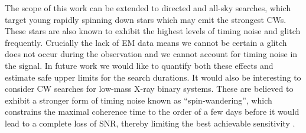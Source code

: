 \documentclass[../full_thesis/full_thesis.tex]{subfiles}
\begin{document}
The scope of this work can be extended to  directed and all-sky searches, which
target young rapidly spinning down stars which may emit the strongest CWs.
These stars are also known to exhibit the highest levels of timing noise and
glitch frequently. Crucially the lack of EM data means we cannot be certain a
glitch does not occur during the observation and we cannot account for timing
noise in the signal.  In future work we would like to quantify both these
effects and estimate safe upper limits for the search durations.
It would also be interesting to consider CW searches for low-mass X-ray binary systems.
These are believed to exhibit a stronger form of timing noise known as
``spin-wandering'', which constrains the maximal coherence time to
the order of a few days before it would lead to a complete loss of
SNR, thereby limiting the best achievable sensitivity
\cite{ligo2015scox1,leaci2015,ScoX1:MDC1}.

\biblio
\end{document}

